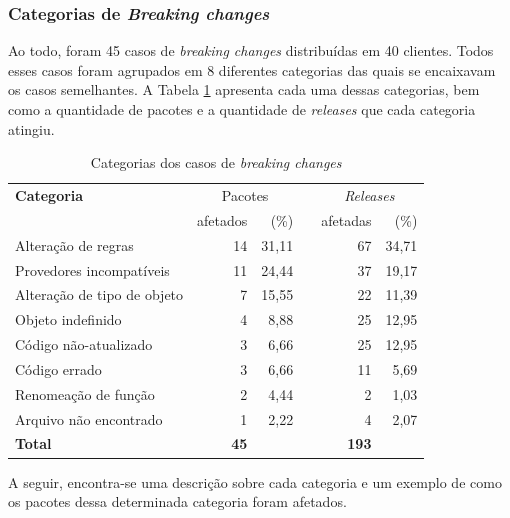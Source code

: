 \subsubsection{Categorias de \textit{Breaking changes}}

Ao todo, foram 45 casos de \textit{breaking changes} distribuídas em 40 clientes. Todos esses casos foram agrupados em 8 diferentes categorias das quais se encaixavam os casos semelhantes. A Tabela \ref{tab:bc_category} apresenta cada uma dessas categorias, bem como a quantidade de pacotes e a quantidade de \textit{releases} que cada categoria atingiu.

\begin{table}\centering
	\begin{tabular}{lrrrrr} \toprule
		\textbf{Categoria} & \multicolumn{2}{c}{Pacotes} & \phantom{ab} & \multicolumn{2}{c}{\textit{Releases}}
		\\
		\cmidrule{2-3} \cmidrule{5-6}
		& afetados & (\%) && afetadas & (\%) \\ \midrule
		Alteração de regras          & 14              & 31,11 && 67                          & 34,71 \\
		Provedores incompatíveis     & 11              & 24,44 && 37                          & 19,17 \\
		Alteração de tipo de objeto  & 7               & 15,55 && 22                          & 11,39 \\
		Objeto indefinido            & 4               & 8,88  && 25                          & 12,95 \\
		Código não-atualizado        & 3               & 6,66  && 25                          & 12,95 \\
		Código errado                & 3               & 6,66  && 11                          & 5,69  \\
		Renomeação de função         & 2               & 4,44  && 2                           & 1,03  \\
		Arquivo não encontrado       & 1               & 2,22  && 4                           & 2,07  \\ \hline
		\textbf{Total}               & \textbf{45}     &       && \textbf{193}              &       \\
		\bottomrule
	\end{tabular}
    \caption{Categorias dos casos de \textit{breaking changes}}
    \label{tab:bc_category}
\end{table}

A seguir, encontra-se uma descrição sobre cada categoria e um exemplo de como os pacotes dessa determinada categoria foram afetados.


